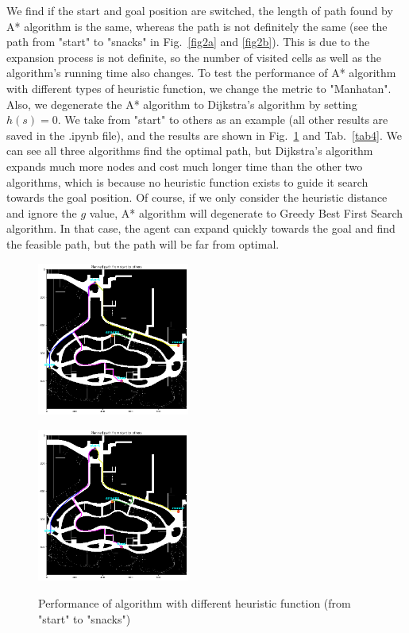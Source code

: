 \documentclass[hyperref]{article}
\theoremstyle{nonumberplain}
\begin{document}
We find if the start and goal position are switched, the length of path found by A* algorithm is the same, whereas the path is not definitely the same (see the path from "start" to "snacks" in Fig.~\ref{fig2a} and \ref{fig2b}). This is due to the expansion process is not definite, so the number of visited cells as well as the algorithm's running time also changes. To test the performance of A* algorithm with different types of heuristic function, we change the metric to "Manhatan". Also, we degenerate the A* algorithm to Dijkstra's algorithm by setting $h(s)=0$. We take from "start" to others as an example (all other results are saved in the .ipynb file), and the results are shown in Fig.~\ref{fig3} and Tab.~\ref{tab4}. We can see all three algorithms find the optimal path, but Dijkstra's algorithm expands much more nodes and cost much longer time than the other two algorithms, which is because no heuristic function exists to guide it search towards the goal position. Of course, if we only consider the heuristic distance and ignore the $g$ value, A* algorithm will degenerate to Greedy Best First Search algorithm. In that case, the agent can expand quickly towards the goal and find the feasible path, but the path will be far from optimal.  

\begin{figure}[H]
	\centering
	\begin{minipage}[t]{0.49\textwidth}
		\centering
		\includegraphics[width=5cm]{start_to_others_manhattan.png}
		\label{fig3a}
	\end{minipage}
	\begin{minipage}[t]{0.49\textwidth}
		\centering
		\includegraphics[width=5cm]{start_to_others_Dijkstra.png}
		\label{fig3b}
	\end{minipage}
	\caption{Performance of algorithm with different heuristic function (from "start" to "snacks")}
	\label{fig3}
\end{figure}
\end{document}

